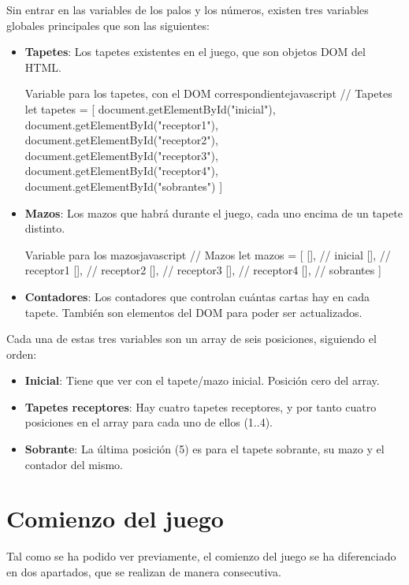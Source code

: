 \documentclass{\ClassPath/viu-tfm-template}
\begin{document}
Sin entrar en las variables de los palos y los números, existen tres variables globales principales que son las siguientes:

\vspace{-1em}
\begin{itemize}
    \item \textbf{Tapetes}: Los tapetes existentes en el juego, que son objetos DOM del HTML.

\begin{mycode}{Variable para los tapetes, con el DOM correspondiente}{javascript}{}
// Tapetes
let tapetes = [
    document.getElementById("inicial"),
    document.getElementById("receptor1"),
    document.getElementById("receptor2"),
    document.getElementById("receptor3"),
    document.getElementById("receptor4"),
    document.getElementById("sobrantes")
]
\end{mycode}


    \item \textbf{Mazos}: Los mazos que habrá durante el juego, cada uno encima de un tapete distinto.
\begin{mycode}{Variable para los mazos}{javascript}{}
// Mazos
let mazos = [
    [], // inicial
    [], // receptor1
    [], // receptor2
    [], // receptor3
    [], // receptor4
    [], // sobrantes
]
\end{mycode}
    \item \textbf{Contadores}: Los contadores que controlan cuántas cartas hay en cada tapete. También son elementos del DOM para poder ser actualizados.
\end{itemize}
\vspace{-1em}


Cada una de estas tres variables son un array de seis posiciones, siguiendo el orden:

\vspace{-1em}
\begin{itemize}
    \item \textbf{Inicial}: Tiene que ver con el tapete/mazo inicial. Posición cero del array.
    \item \textbf{Tapetes receptores}: Hay cuatro tapetes receptores, y por tanto cuatro posiciones en el array para cada uno de ellos (1..4).
    \item \textbf{Sobrante}: La última posición (5) es para el tapete sobrante, su mazo y el contador del mismo.
\end{itemize}
\vspace{-1em}

\section{Comienzo del juego}
Tal como se ha podido ver previamente, el comienzo del juego se ha diferenciado en dos apartados, que se realizan de manera consecutiva.
\end{document}
